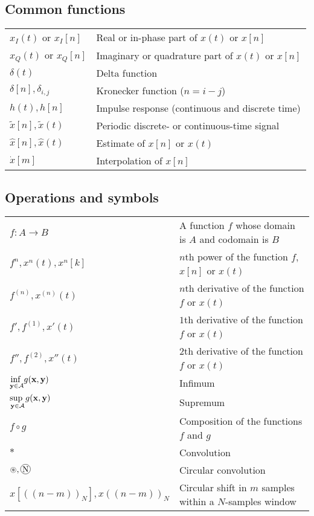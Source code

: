 \documentclass{article}
\newcommand*\circconv[1]{%
\tikz[baseline=(C.base)]\node[draw,circle,inner sep=0.5pt](C) {#1};\!
}
\begin{document}
\subsection{Common functions}
\begin{xltabular}{\textwidth}{XX}
    \(x_I(t)\) or \(x_I[n]\) & Real or in-phase part of \(x(t)\) or \(x[n]\)\\
    \(x_Q(t)\) or \(x_Q[n]\) & Imaginary or quadrature part of \(x(t)\) or \(x[n]\)\\
    \(\delta(t)\) & Delta function\\
    \(\delta[n], \delta_{i,j}\) & Kronecker function (\(n = i-j\))\\
    \(h(t), h[n]\) & Impulse response (continuous and discrete time)\\
    \(\tilde{x}[n], \tilde{x}(t)\) & Periodic discrete- or continuous-time signal\\
    \(\hat{x}[n], \hat{x}(t)\) & Estimate of \(x[n]\) or \(x(t)\)\\
    \(\dot{x}[m]\) & Interpolation of \(x[n]\)\\
\end{xltabular}
\subsection{Operations and symbols}
\begin{xltabular}{\textwidth}{XX}
    \(f: A \rightarrow B\)& A function \(f\) whose domain is \(A\) and codomain is \(B\)\\
    \(f^{n}, x^{n}(t), x^{n}[k]\) & \(n\)th power of the function \(f\), \(x[n]\) or \(x(t)\)\\
    \(f^{\left( n \right)},  x^{(n)}(t)\) & \(n\)th derivative of the function \(f\) or \(x(t)\)\\
    \(f', f^{\left( 1 \right)}, x'(t)\) & \(1\)th derivative of the function \(f\) or \(x(t)\)\\
    \(f'', f^{\left( 2 \right)}, x''(t)\) & \(2\)th derivative of the function \(f\) or \(x(t)\)\\
    \(\underset{\mathbf{y} \in \mathcal{A}}{\textnormal{inf }} g(\mathbf{x},\mathbf{y})\) & Infimum\\
    \(\underset{\mathbf{y} \in \mathcal{A}}{\textnormal{sup }} g(\mathbf{x},\mathbf{y})\) & Supremum\\
    \(f \circ g\) & Composition of the functions \(f\) and \(g\)\\
    \(*\) & Convolution\\
    \(\circledast, \circconv{N}\) & Circular convolution\\
    \(x\left[ \left( \left( n - m \right) \right)_N \right], x \left( \left( n - m \right) \right)_N\) & Circular shift in \(m\) samples within a \(N\)-samples window\\
\end{xltabular}
\end{document}
